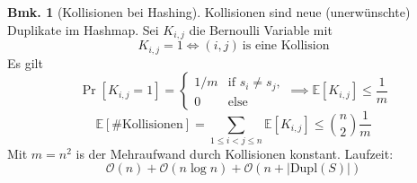 \documentclass[a4paper, 10pt]{article}
\theoremstyle{definition}
\newtheorem*{note}{Bmk.}
\theoremstyle{named}
\newcommand{\BO}{\mathcal{O}}
\newcommand{\E}{\mathbb{E}}
\begin{document}
\begin{note}[Kollisionen bei Hashing]
    Kollisionen sind neue (unerwünschte) Duplikate im Hashmap. Sei $K_{i, j}$ die Bernoulli Variable mit 
    $$K_{i,j} = 1 \iff (i,j) \ \text{is eine Kollision}$$
    Es gilt $$\Pr[K_{i,j} = 1] = \begin{cases}
        1/m & \text{if $s_i \neq s_j$}, \\
        0 & \text{else}
    \end{cases}
    \implies \E[K_{i,j}] \leq \frac{1}{m}$$
    $$\E[\text{\#Kollisionen}] = \sum_{1 \leq i < j \leq n} \E[K_{i, j}] \leq \binom{n}{2}\frac{1}{m}$$
    Mit $m = n^2$ is der Mehraufwand durch Kollisionen konstant. Laufzeit:
    $$\BO(n) + \BO(n \log n) + \BO(n + |\text{Dupl}(S)|)$$
\end{note}
\end{document}
